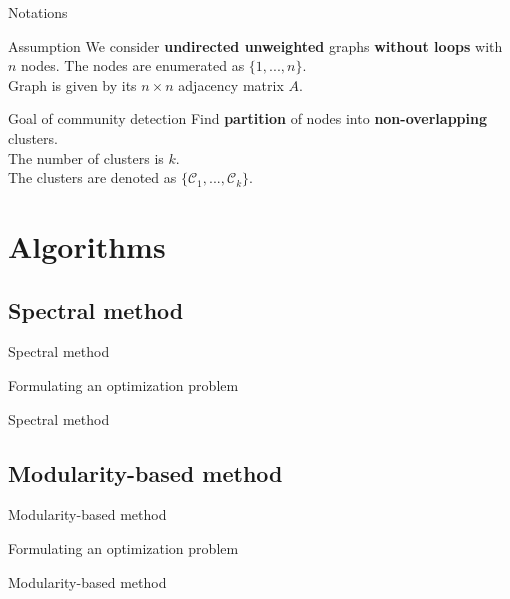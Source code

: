 \documentclass{beamer}
\theoremstyle{definition}
\theoremstyle{plain}
\theoremstyle{remark}
\begin{document}
			\begin{frame}{Notations}

			\begin{block}{Assumption}
				We consider \textbf{undirected unweighted} graphs \textbf{without loops} with $n$ nodes.
				The nodes are enumerated as $\{ 1, ..., n\}$.\\
				Graph is given by its $n \times n $ adjacency matrix $A$.

			\end{block}

			\begin{block}{Goal of community detection}
				Find \textbf{partition} of nodes into \textbf{non-overlapping} clusters.\\
				The number of clusters is $k$.\\
				The clusters are denoted as $\{ \mathcal{C}_1, ..., \mathcal{C}_k\}$.
			\end{block}
		\end{frame}

	\section{Algorithms}
		\subsection{Spectral method}
			\begin{frame}{Spectral method}
				\begin{block}{Formulating an optimization problem}
				\end{block}
			\end{frame}

			\begin{frame}{Spectral method}
				
			\end{frame}

		\subsection{Modularity-based method}
			\begin{frame}{Modularity-based method}
				\begin{block}{Formulating an optimization problem}
				\end{block}
			\end{frame}

			\begin{frame}{Modularity-based method}
				
			\end{frame}
	
\end{document}
